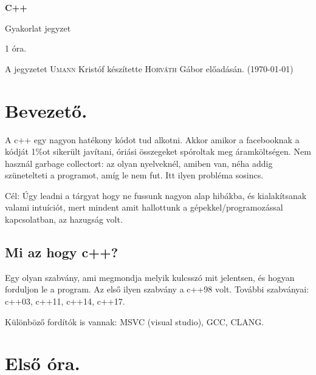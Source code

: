 \documentclass[a4paper,11.5pt]{article}
\begin{document}
	\setlength\parindent{0pt}
	\def\s{\hspace{0.2mm}\vphantom{\beta}}
	\def\Z{\mathbb{Z}}
	\def\Q{\mathbb{Q}}
	\def\R{\mathbb{R}}
	\def\C{\mathbb{C}}
	\def\N{\mathbb{N}}
	\def\Ra{\overline{\mathbb{R}}}
	
	\def\sume{\displaystyle\sum_{n=1}^{+\infty}}
	\def\sumn{\displaystyle\sum_{n=0}^{+\infty}}
	
	\def\narrow{\underset{n\rightarrow+\infty}{\longrightarrow}}
	\def\limn{\displaystyle\lim_{n\to +\infty}}
	\def\limx{\displaystyle\lim_{x\to +\infty}}
	
	\theoremstyle{definition}
	\newtheorem{theorem}{Tétel}[subsection] 
	
	\theoremstyle{definition}
	\newtheorem{definition}[theorem]{Definíció} 
	\newtheorem{example}[theorem]{Példa} 
	\newtheorem{task}[theorem]{Feladat} 
	\newtheorem{note}[theorem]{Megjegyzés}
	\begin{center}
		{\LARGE\textbf{C++}}
		
		{\Large Gyakorlat jegyzet}
		
		1 óra.
	\end{center}
	A jegyzetet \textsc{Umann} Kristóf készítette \textsc{Horváth} Gábor  előadásán. (\today)
	\section{Bevezető.}
	A c++ egy nagyon hatékony kódot tud alkotni. Akkor amikor a facebooknak a kódját 1\%ot sikerült javítani, óriási összegeket spóroltak meg áramköltségen. Nem használ garbage collectort: az olyan nyelveknél, amiben van, néha addig szünetelteti a programot, amíg le nem fut. Itt ilyen probléma sosincs.
	
	\medskip
	Cél: Úgy leadni a tárgyat hogy ne fussunk nagyon alap hibákba, és kialakítsanak valami intuíciót, mert mindent amit hallottunk a gépekkel/programozással kapcsolatban, az hazugság volt.
	\subsection{Mi az hogy c++?}
	Egy olyan szabvány, ami megmondja melyik kulcsszó mit jelentsen, és hogyan forduljon le a program. Az első ilyen szabvány a {c++98} volt. További szabványai: {c++03}, {c++11}, {c++14}, {c++17}.
	
	\medskip
	Különböző fordítók is vannak: MSVC (visual studio), GCC, CLANG. 
	\section{Első óra.}
\end{document}
